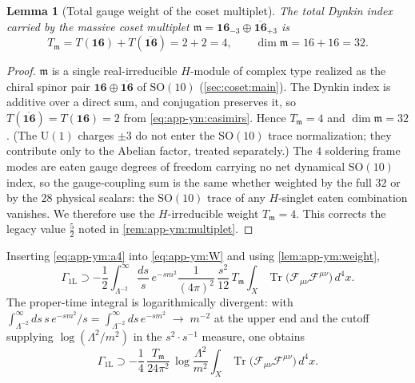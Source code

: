 \documentclass[11pt]{article}
\theoremstyle{plain}
\newtheorem{lemma}[theorem]{Lemma}
\theoremstyle{definition}
\theoremstyle{remark}
\newcommand{\SO}[1]{\mathrm{SO}(#1)}
\newcommand{\U}[1]{\mathrm{U}(#1)}
\newcommand{\Tr}{\operatorname{Tr}}
\newcommand{\SOTen}{\SO{10}}
\newcommand{\UOne}{\U{1}}
\begin{document}
\begin{lemma}[Total gauge weight of the coset multiplet]
\label{lem:app-ym:weight}
The total Dynkin index carried by the massive coset multiplet
$\mathfrak m=\mathbf{16}_{-3}\oplus\overline{\mathbf{16}}_{+3}$ is
\begin{equation}\label{eq:app-ym:Ttot}
  T_{\mathfrak m}
  =T(\mathbf{16})+T(\overline{\mathbf{16}})
  =2+2=4 ,
  \qquad
  \dim\mathfrak m=16+16=32 .
\end{equation}
\end{lemma}

\begin{proof}
$\mathfrak m$ is a single real-irreducible $H$-module of complex type
realized as the chiral spinor pair $\mathbf{16}\oplus
\overline{\mathbf{16}}$ of $\SOTen$
(\autoref{sec:coset:main}). The Dynkin index is additive over a
direct sum, and conjugation preserves it, so
$T(\overline{\mathbf{16}})=T(\mathbf{16})=2$ from
\eqref{eq:app-ym:casimirs}. Hence $T_{\mathfrak m}=4$ and
$\dim\mathfrak m=32$. (The $\UOne$ charges $\pm3$ do not enter the
$\SOTen$ trace normalization; they contribute only to the Abelian
factor, treated separately.) The $4$ soldering frame modes are eaten
gauge degrees of freedom carrying no net dynamical $\SOTen$ index, so the
gauge-coupling sum is the same whether weighted by the full $32$ or by
the $28$ physical scalars: the $\SOTen$ trace of any $H$-singlet eaten
combination vanishes. We therefore use the $H$-irreducible weight
$T_{\mathfrak m}=4$. This corrects the legacy value $\tfrac52$ noted in
\autoref{rem:app-ym:multiplet}.
\end{proof}

Inserting \eqref{eq:app-ym:a4} into \eqref{eq:app-ym:W} and using
\autoref{lem:app-ym:weight},
\begin{equation}\label{eq:app-ym:insert}
  \Gamma_{\mathrm{1L}}
  \supset
  -\frac12\int_{\Lambda^{-2}}^{\infty}\frac{ds}{s}\,e^{-sm^{2}}
   \frac{1}{(4\pi)^{2}}\,\frac{s^{2}}{12}\,T_{\mathfrak m}
   \int_{X}\Tr\bigl(\mathcal F_{\mu\nu}\mathcal F^{\mu\nu}\bigr)\,d^{4}x .
\end{equation}
The proper-time integral is logarithmically divergent: with
$\int_{\Lambda^{-2}}^{\infty}ds\,s\,e^{-sm^{2}}/s
=\int_{\Lambda^{-2}}^{\infty}ds\,e^{-sm^{2}}
\;\to\;m^{-2}$ at the upper end and the cutoff supplying
$\log(\Lambda^{2}/m^{2})$ in the $s^{2}\!\cdot s^{-1}$ measure, one
obtains
\begin{equation}\label{eq:app-ym:log}
  \Gamma_{\mathrm{1L}}
  \supset
  -\frac14\,\frac{T_{\mathfrak m}}{24\pi^{2}}\,
   \log\frac{\Lambda^{2}}{m^{2}}
   \int_{X}\Tr\bigl(\mathcal F_{\mu\nu}\mathcal F^{\mu\nu}\bigr)\,d^{4}x .
\end{equation}
\end{document}
